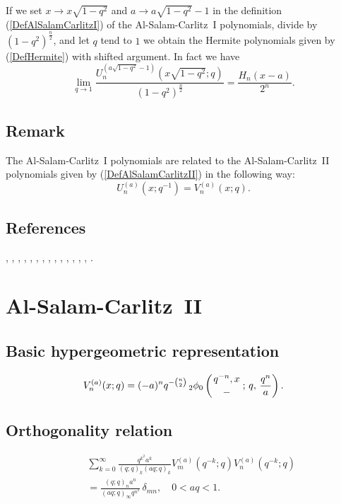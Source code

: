 \documentclass[envcountchap,graybox]{svmono}
\newcommand{\qhyp}[5]{\mbox{}_{#1}{\phi}_{#2}
\left(\genfrac{}{}{0pt}{}{#3}{#4}\,;\,q,\,#5\right)}
\newcommand{\qhyp}[5]{\,\mbox{}_{#1}\phi_{#2}\!\left(
  \genfrac{}{}{0pt}{}{#3}{#4};#5\right)}
\begin{document}
{{If we set $x\rightarrow x\sqrt{1-q^2}$ and $a\rightarrow a\sqrt{1-q^2}-1$
in the definition (\ref{DefAlSalamCarlitzI}) of the Al-Salam-Carlitz~I
polynomials, divide by $(1-q^2)^{\frac{n}{2}}$, and let $q$ tend to $1$ we
obtain the Hermite polynomials given by (\ref{DefHermite}) with shifted
argument. In fact we have
\begin{equation}
\lim_{q\rightarrow 1}\frac{U_n^{(a\sqrt{1-q^2}-1)}(x\sqrt{1-q^2};q)}
{(1-q^2)^{\frac{n}{2}}}=\frac{H_n(x-a)}{2^n}.
\end{equation}

\subsection*{Remark}
The Al-Salam-Carlitz~I polynomials are related to the Al-Salam-Carlitz~II
polynomials given by (\ref{DefAlSalamCarlitzII}) in the following way:
$$U_n^{(a)}(x;q^{-1})=V_n^{(a)}(x;q).$$

\subsection*{References}
\cite{AlSalam90}, \cite{AlSalamCarlitz}, \cite{AlSalamChihara76}, \cite{AskeySuslovII},
\cite{AtakRahmanSuslov}, \cite{Chihara68II}, \cite{Chihara78}, \cite{DattaGriffin},
\cite{Dehesa}, \cite{DohaAhmed2005}, \cite{GasperRahman90}, \cite{Ismail85I},
\cite{IsmailMuldoon}, \cite{Kim}, \cite{Zeng95}.


\section{Al-Salam-Carlitz~II}
\par\setcounter{equation}{0}

\subsection*{Basic hypergeometric representation}
\begin{equation}
\label{DefAlSalamCarlitzII}
V_n^{(a)}(x;q)=
(-a)^nq^{-\binom{n}{2}}\,\qhyp{2}{0}{q^{-n},x}{-}{\frac{q^n}{a}}.
\end{equation}

\subsection*{Orthogonality relation}
\begin{eqnarray}
\label{OrtAlSalamCarlitzII}
& &\sum_{k=0}^{\infty}\frac{q^{k^2}a^k}{(q;q)_k(aq;q)_k}
V_m^{(a)}(q^{-k};q)V_n^{(a)}(q^{-k};q)\nonumber\\
& &{}=\frac{(q;q)_na^n}{(aq;q)_{\infty}q^{n^2}}\,\delta_{mn},\quad 0<aq<1.
\end{eqnarray}

}}
\end{document}
